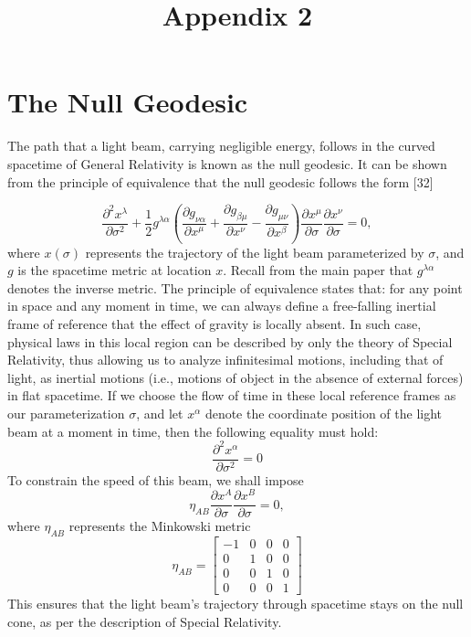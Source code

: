 \documentclass{article}
\date{}
\title{Appendix 2}
\begin{document}
\maketitle

\section{The Null Geodesic}

The path that a light beam, carrying negligible energy, follows 
in the curved spacetime of General Relativity is known as the 
null geodesic. It can be shown from the principle of 
equivalence that the null geodesic follows the form [32]

\[
\frac{\partial^2 x^\lambda}{\partial \sigma^2} + 
\frac{1}{2} g^{\lambda\alpha} \left( \frac{\partial g_{\nu\alpha}}{\partial x^\mu}
+\frac{\partial g_{\beta\mu}}{\partial x^\nu}
-\frac{\partial g_{\mu\nu}}{\partial x^\beta}\right)
\frac{\partial x^\mu}{\partial \sigma}
\frac{\partial x^\nu}{\partial \sigma}
 = 0,
\]
where $x(\sigma)$ represents the trajectory of the light beam parameterized 
by $\sigma$, and $g$ is the spacetime metric at location $x$. 
Recall from the main paper that $ g^{\lambda\alpha}$ denotes the 
inverse metric. The principle of equivalence states that: for any point 
in space and any moment in time, we can always define a free-falling 
inertial frame of reference that the effect of gravity is locally absent. 
In such case, physical laws in this local region can be described by 
only the theory of Special Relativity, thus allowing us to analyze 
infinitesimal motions, including that of light, as inertial motions 
(i.e., motions of object in the absence of external forces) in 
flat spacetime. If we choose the flow of time in these local reference 
frames as our parameterization $\sigma$, and let $x^\alpha$ denote 
the coordinate position of the light beam at a moment in time, then 
the following equality must hold:
\[
\frac{\partial^2 x^\alpha}{\partial \sigma^2} = 0
\]
To constrain the speed of this beam, we shall impose
\[
\eta_{AB} \frac{\partial x^A}{\partial \sigma} \frac{\partial x^B}{\partial \sigma}= 0,
\]
where $\eta_{AB}$ represents the Minkowski metric
\[
\eta_{AB} =
\begin{bmatrix}
-1 & 0 & 0 & 0 \\
0 & 1 & 0 & 0 \\
0 & 0 & 1 & 0 \\
0 & 0 & 0 & 1
\end{bmatrix}
\]
This ensures that
the light beam's trajectory through spacetime 
stays on the null cone, as per the description of Special Relativity.
\\
\end{document}
